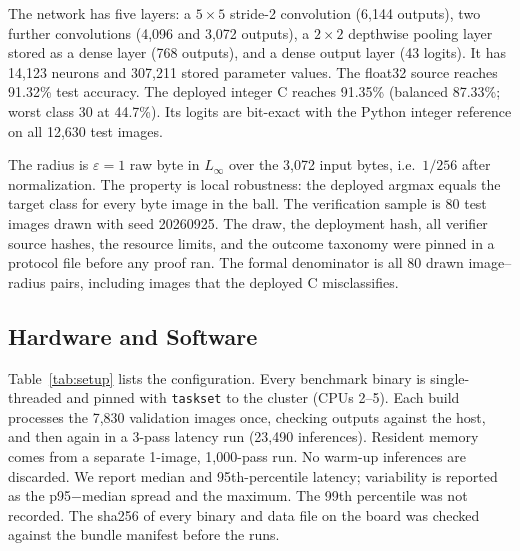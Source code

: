 The network has five layers: a $5\times5$ stride-2 convolution (6,144 outputs), two further convolutions (4,096 and 3,072 outputs), a $2\times2$ depthwise pooling layer stored as a dense layer (768 outputs), and a dense output layer (43 logits). It has 14,123 neurons and 307,211 stored parameter values. The float32 source reaches 91.32\% test accuracy. The deployed integer C reaches 91.35\% (balanced 87.33\%; worst class 30 at 44.7\%). Its logits are bit-exact with the Python integer reference on all 12,630 test images.

The radius is $\varepsilon = 1$ raw byte in $L_\infty$ over the 3,072 input bytes, i.e.\ $1/256$ after normalization. The property is local robustness: the deployed argmax equals the target class for every byte image in the ball. The verification sample is 80 test images drawn with seed 20260925. The draw, the deployment hash, all verifier source hashes, the resource limits, and the outcome taxonomy were pinned in a protocol file before any proof ran. The formal denominator is all 80 drawn image--radius pairs, including images that the deployed C misclassifies.

\subsection{Hardware and Software}

Table~\ref{tab:setup} lists the configuration. Every benchmark binary is single-threaded and pinned with \texttt{taskset} to the \Aseven{} cluster (CPUs 2--5). Each build processes the 7,830 validation images once, checking outputs against the host, and then again in a 3-pass latency run (23,490 inferences). Resident memory comes from a separate 1-image, 1,000-pass run. No warm-up inferences are discarded. We report median and 95th-percentile latency; variability is reported as the p95$-$median spread and the maximum. The 99th percentile was not recorded. The sha256 of every binary and data file on the board was checked against the bundle manifest before the runs.

